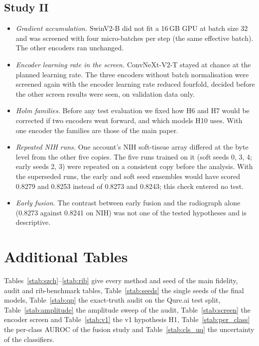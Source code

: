 \documentclass[journal]{IEEEtran}
\begin{document}
\subsection{Study II}
\begin{itemize}
\item \emph{Gradient accumulation.} SwinV2-B did not fit a 16\,GB GPU at batch size 32 and was screened with four micro-batches per step
 (the same effective batch). The other encoders ran unchanged.
\item \emph{Encoder learning rate in the screen.} ConvNeXt-V2-T stayed at chance at the planned learning rate. The three encoders
 without batch normalisation were screened again with the encoder learning rate reduced fourfold, decided before the other screen results
 were seen, on validation data only.
\item \emph{Holm families.} Before any test evaluation we fixed how H6 and H7 would be corrected if two encoders went forward, and which
 models H10 uses. With one encoder the families are those of the main paper.
\item \emph{Repeated NIH runs.} One account's NIH soft-tissue array differed at the byte level from the other five copies. The five runs
 trained on it (soft seeds 0, 3, 4; early seeds 2, 3) were repeated on a consistent copy before the analysis. With the superseded runs,
 the early and soft seed ensembles would have scored 0.8279 and 0.8253 instead of 0.8273 and 0.8243; this check entered no test.
\item \emph{Early fusion.} The contrast between early fusion and the radiograph alone (0.8273 against 0.8241 on NIH) was not one of the
 tested hypotheses and is descriptive.
\end{itemize}

\section{Additional Tables}
\label{sup:tables}
Tables~\ref{stab:szch}--\ref{stab:rib} give every method and seed of the main fidelity, audit and rib-benchmark tables,
Table~\ref{stab:seeds} the single seeds of the final models, Table~\ref{stab:qp} the exact-truth audit on the Qure.ai test split,
Table~\ref{stab:amplitude} the amplitude sweep of the audit, Table~\ref{stab:screen} the encoder screen and Table~\ref{stab:v1} the v1
hypothesis H1, Table~\ref{stab:per_class} the per-class AUROC of the fusion study and Table~\ref{stab:cls_uq} the uncertainty of the
classifiers.
\end{document}
